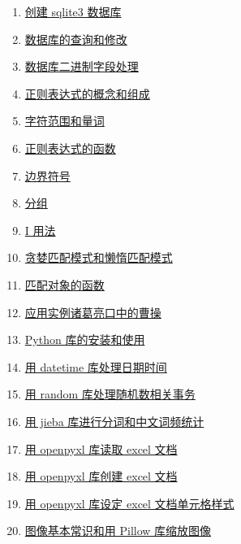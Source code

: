 \documentclass[11pt]{article}
\begin{document}
\begin{multicols}{2}
\begin{enumerate}
		\item  \href{https://mp.weixin.qq.com/s/Xk5XwufqgIBP6anvqeE_Kg}{创建 sqlite3 数据库} %
		\item  \href{https://mp.weixin.qq.com/s/t-3KQiV-6kr5bvkCgyCHqQ}{数据库的查询和修改} %
		\item  \href{https://mp.weixin.qq.com/s/q1Ic2dnuD0p3e4ooRQuCQg}{数据库二进制字段处理} %
		\item  \href{https://mp.weixin.qq.com/s/0cjquK6qg34n7gOGAwCUKA}{正则表达式的概念和组成} %
		\item  \href{https://mp.weixin.qq.com/s/_5YzuK8yfvqiLNQl0GhBFQ}{字符范围和量词} %
		\item  \href{https://mp.weixin.qq.com/s/MUj-Ag3BwwgIeTOEglCJtQ}{正则表达式的函数} %
		\item  \href{https://mp.weixin.qq.com/s/fBse_C4J5E6hvtKjE6HFcQ}{边界符号} %
		\item  \href{https://mp.weixin.qq.com/s/HUJ9sPFkm9-_ETBo4sTlVw}{分组} %
		\item  \href{https://mp.weixin.qq.com/s/l3u_tVnzUEfNIBMpgWyk5g}{I 用法} %
		\item  \href{https://mp.weixin.qq.com/s/GmQ0aFD0RQCNYT0CmPM0gw}{贪婪匹配模式和懒惰匹配模式} %
		\item  \href{https://mp.weixin.qq.com/s/3O2CQsjAWQaQMBEjo4Nkhw}{匹配对象的函数} %
		\item  \href{https://mp.weixin.qq.com/s/V2x6zY8laEVjbEr_M6OKDg}{应用实例诸葛亮口中的曹操} %
		\item  \href{https://mp.weixin.qq.com/s/op_tVmHEMeY_D3zWnx8_4A}{Python 库的安装和使用} %
		\item  \href{https://mp.weixin.qq.com/s/UlbwKaSqt1846jPbOYSCUg}{用 datetime 库处理日期时间} %
		\item  \href{https://mp.weixin.qq.com/s/cyyvDZhC6G5j2QpRsVMcmA}{用 random 库处理随机数相关事务} %
		\item  \href{https://mp.weixin.qq.com/s/-eV1Gk9aOruR0TE50k17Ug}{用 jieba 库进行分词和中文词频统计} %
		\item  \href{https://mp.weixin.qq.com/s/yI0fSnySAVEjL2meGHywdw}{用 openpyxl 库读取 excel 文档} %
		\item  \href{https://mp.weixin.qq.com/s/Ao7CrSVixNan4aRySpdDjg}{用 openpyxl 库创建 excel 文档} %
		\item  \href{https://mp.weixin.qq.com/s/MP2ZeDPuIPmxJdnNgP697w}{用 openpyxl 库设定 excel 文档单元格样式} %
		\item  \href{https://mp.weixin.qq.com/s/IrAQVqKVhrTq9OSIPYv58w}{图像基本常识和用 Pillow 库缩放图像} %

\end{enumerate}
\end{multicols}
\end{document}
